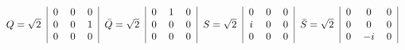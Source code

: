 \begin{equation}\label{MatrixGeneratorsN2F}
\begin{tabular}{c|ccc|c|ccc|c|ccc|c|ccc|c}
                        &$0$&$0$&$0$&           &$0$&$1$&$0$&    &$0$&$0$&$0$ &&$0$&$0$&$0$&\\
$\!\!\!\!\!\!Q=\sqrt{2}$&$0$&$0$&$1$&${\bar Q}=\sqrt{2}$&$0$&$0$&$0$&
$S=\sqrt{2}$&$i$&$0$&$0$ &${\bar S}=\sqrt{2}$&$0$&$0$&$0$&\\
    &$0$&$0$&$0$&    &$0$&$0$&$0$&                &$0$&$0$&$0$&    &$0$&$-i$&$0$&\\
\end{tabular}\\
\end{equation}


